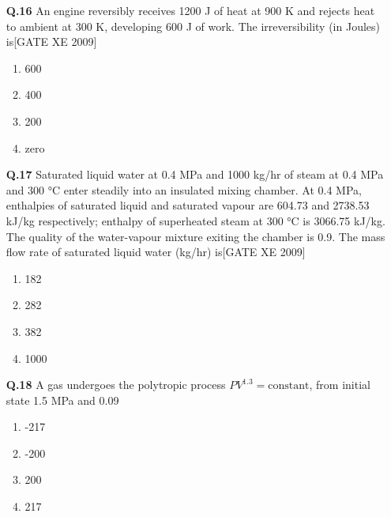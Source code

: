 \documentclass[journal,12pt,onecolumn]{IEEEtran}
\theoremstyle{remark}
\begin{document}
\begin{enumerate}
\begin{enumerate}
\begin{enumerate}
\vspace{0.3cm}

\item[\textbf{Q.16}] An engine reversibly receives 1200 J of heat at 900 K and rejects heat to ambient at 300 K, developing 600 J of work. The irreversibility (in Joules) is\hfill[GATE XE 2009]
\begin{multicols}{2}
\begin{enumerate}
    \item 600
    \item 400
    \item 200
    \item zero
\end{enumerate}
\end{multicols}

\vspace{0.3cm}

\item[\textbf{Q.17}] Saturated liquid water at 0.4 MPa and 1000 kg/hr of steam at 0.4 MPa and 300 °C enter steadily into an insulated mixing chamber. At 0.4 MPa, enthalpies of saturated liquid and saturated vapour are 604.73 and 2738.53 kJ/kg respectively; enthalpy of superheated steam at 300 °C is 3066.75 kJ/kg. The quality of the water-vapour mixture exiting the chamber is 0.9. The mass flow rate of saturated liquid water (kg/hr) is\hfill[GATE XE 2009]
\begin{multicols}{2}
\begin{enumerate}
    \item 182
    \item 282
    \item 382
    \item 1000
\end{enumerate}
\end{multicols}

\vspace{0.3cm}

\item[\textbf{Q.18}]A gas undergoes the polytropic process $PV^{1.3} = \text{constant}$, from initial state 1.5 MPa and 0.09 %
\begin{multicols}{2}
\begin{enumerate}
    \item -217
    \item -200
    \item 200
    \item 217
\end{enumerate}
\end{multicols}


\end{enumerate}
\end{enumerate}
\end{enumerate}
\end{document}
